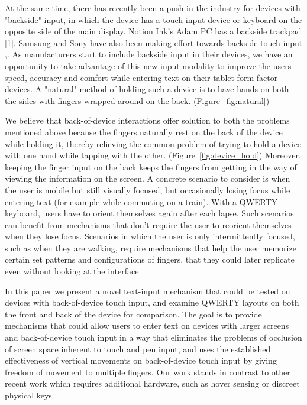 At the same time, there has recently been a push in the industry for devices with "backside" input, in which the device has a touch input device or keyboard on the opposite side of the main display. Notion Ink's Adam PC has a backside trackpad [1]. Samsung and Sony have also been making effort towards backside touch input \cite{Samsung},\cite{Sony}. As manufacturers start to include backside input in their devices, we have an opportunity to take advantage of this new input modality to improve the users speed, accuracy and comfort while entering text on their tablet form-factor devices. A "natural" method of holding such a device is to have hands on both the sides with fingers wrapped around on the back. \cite{Vogel} (Figure~\ref{fig:natural})

We believe that back-of-device interactions offer solution to both the problems mentioned above because the fingers naturally rest on the back of the device while holding it, thereby relieving the common problem of trying to hold a device with one hand while tapping with the other. (Figure~\ref{fig:device_hold}) Moreover, keeping the finger input on the back keeps the fingers from getting in the way of viewing the information on the screen. A concrete scenario to consider is when the user is mobile but still visually focused, but occasionally losing focus while entering text (for example while commuting on a train).  With a QWERTY keyboard, users have to orient themselves again after each lapse. Such scenarios can benefit from mechanisms that don't require the user to reorient themselves when they lose focus.  Scenarios in which the user is only intermittently focused, such as when they are walking, require mechanisms that help the user memorize certain set patterns and configurations of fingers, that they could later replicate even without looking at the interface. 

In this paper we present a novel text-input mechanism that could be tested on devices with back-of-device touch input, and examine QWERTY layouts on both the front and back of the device for comparison. The goal is to provide mechanisms that could allow users to enter text on
devices with larger screens and back-of-device touch input in a way that eliminates the problems of occlusion of screen space inherent to touch and pen input, and uses the established effectiveness of
vertical movements on back-of-device touch input \cite{Wobbrock} by giving freedom of movement to multiple fingers.  Our work stands in contrast to other recent work which requires additional hardware, such as hover sensing \cite{LucidTouch} or discreet physical keys \cite{RearType}.

